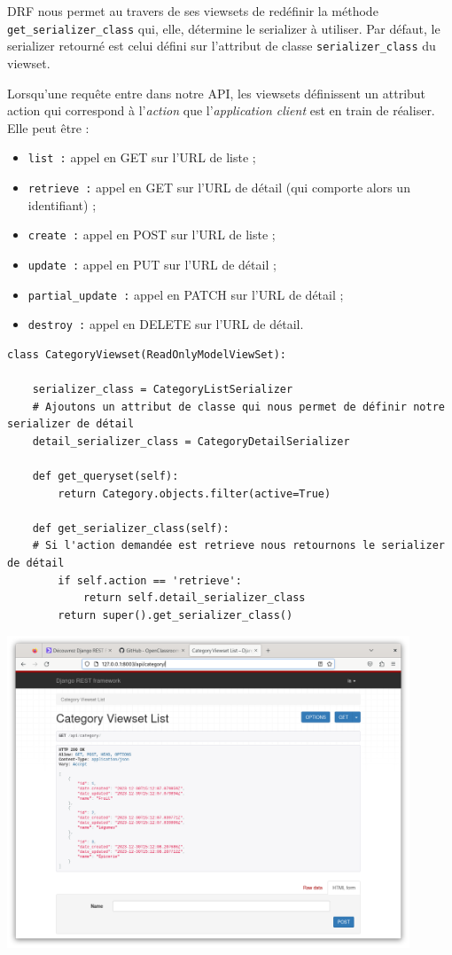 \documentclass[a4paper]{article}
\begin{document}
DRF nous permet au travers de ses viewsets de redéfinir la méthode {\tt get\_serializer\_class}  qui, elle, détermine le serializer à utiliser. Par défaut, le serializer retourné est celui défini sur l’attribut de classe {\tt serializer\_class}  du viewset.

Lorsqu’une requête entre dans notre API, les viewsets définissent un attribut action  qui correspond à l’{\em action} que l’{\em application client} est en train de réaliser. Elle peut être :
\begin{itemize}
\item {\tt list :} appel en GET  sur l’URL de liste ;
\item {\tt retrieve :} appel en GET  sur l’URL de détail (qui comporte alors un identifiant) ;
\item {\tt create :} appel en POST  sur l’URL de liste ;
\item {\tt update :} appel en PUT  sur l’URL de détail ;
\item {\tt partial\_update :} appel en PATCH  sur l’URL de détail ;
\item {\tt destroy :} appel en DELETE  sur l’URL de détail.
\end{itemize}
\begin{verbatim}
class CategoryViewset(ReadOnlyModelViewSet):
 
    serializer_class = CategoryListSerializer
    # Ajoutons un attribut de classe qui nous permet de définir notre serializer de détail
    detail_serializer_class = CategoryDetailSerializer
 
    def get_queryset(self):
        return Category.objects.filter(active=True)
 
    def get_serializer_class(self):
    # Si l'action demandée est retrieve nous retournons le serializer de détail
        if self.action == 'retrieve':
            return self.detail_serializer_class
        return super().get_serializer_class()
\end{verbatim}
\begin{center}
\includegraphics[width=12cm]{images/image17.png}
\end{center}
\end{document}
